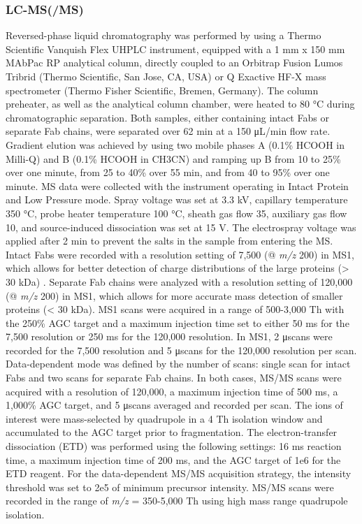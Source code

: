 \subsubsection{LC-MS(/MS)}
Reversed-phase liquid chromatography was performed by using a Thermo Scientific Vanquish Flex UHPLC instrument, equipped with a 1 mm x 150 mm MAbPac RP analytical column, directly coupled to an Orbitrap Fusion Lumos Tribrid (Thermo Scientific, San Jose, CA, USA) or Q Exactive HF-X mass spectrometer (Thermo Fisher Scientific, Bremen, Germany). The column preheater, as well as the analytical column chamber, were heated to 80 °C during chromatographic separation. Both samples, either containing intact Fabs or separate Fab chains, were separated over 62 min at a 150 μL/min flow rate. Gradient elution was achieved by using two mobile phases A (0.1\% HCOOH in Milli-Q) and B (0.1\% HCOOH in CH3CN) and ramping up B from 10 to 25\% over one minute, from 25 to 40\% over 55 min, and from 40 to 95\% over one minute. MS data were collected with the instrument operating in Intact Protein and Low Pressure mode. Spray voltage was set at 3.3 kV, capillary temperature 350 °C, probe heater temperature 100 °C, sheath gas flow 35, auxiliary gas flow 10, and source-induced dissociation was set at 15 V. The electrospray voltage was applied after 2 min to prevent the salts in the sample from entering the MS. Intact Fabs were recorded with a resolution setting of 7,500 (@ \emph{m/z} 200) in MS1, which allows for better detection of charge distributions of the large proteins (> 30 kDa) \cite{waterbeemd2018dissecting}. Separate Fab chains were analyzed with a resolution setting of 120,000 (@ \emph{m/z} 200) in MS1, which allows for more accurate mass detection of smaller proteins (< 30 kDa). MS1 scans were acquired in a range of 500-3,000 Th with the 250\% AGC target and a maximum injection time set to either 50 ms for the 7,500 resolution or 250 ms for the 120,000 resolution. In MS1, 2 μscans were recorded for the 7,500 resolution and 5 μscans for the 120,000 resolution per scan. Data-dependent mode was defined by the number of scans: single scan for intact Fabs and two scans for separate Fab chains. In both cases, MS/MS scans were acquired with a resolution of 120,000, a maximum injection time of 500 ms, a 1,000\% AGC target, and 5 μscans averaged and recorded per scan. The ions of interest were mass-selected by quadrupole in a 4 Th isolation window and accumulated to the AGC target prior to fragmentation. The electron-transfer dissociation (ETD) was performed using the following settings: 16 ms reaction time, a maximum injection time of 200 ms, and the AGC target of 1e6 for the ETD reagent. For the data-dependent MS/MS acquisition strategy, the intensity threshold was set to 2e5 of minimum precursor intensity. MS/MS scans were recorded in the range of \emph{m/z} = 350-5,000 Th using high mass range quadrupole isolation.

